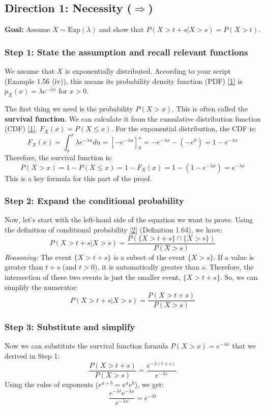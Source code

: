 \documentclass[11pt,a4paper]{article}
\begin{document}
\subsection{Direction 1: Necessity ($\Rightarrow$)}

\noindent \textbf{Goal:} Assume $X \sim \text{Exp}(\lambda)$ and show that $P(X > t + s | X > s) = P(X > t)$.

\subsubsection*{Step 1: State the assumption and recall relevant functions}
We assume that $X$ is exponentially distributed. According to your script (Example 1.56 (iv)), this means its probability density function (PDF) \hyperlink{note:pdfcdf}{[1]} is $p_X(x) = \lambda e^{-\lambda x}$ for $x > 0$.

The first thing we need is the probability $P(X > x)$. This is often called the \textbf{survival function}. We can calculate it from the cumulative distribution function (CDF) \hyperlink{note:pdfcdf}{[1]}, $F_X(x) = P(X \le x)$.
For the exponential distribution, the CDF is:
\[ F_X(x) = \int_0^x \lambda e^{-\lambda u} du = [ -e^{-\lambda u} ]_0^x = -e^{-\lambda x} - (-e^0) = 1 - e^{-\lambda x} \]
Therefore, the survival function is:
\[ P(X > x) = 1 - P(X \le x) = 1 - F_X(x) = 1 - (1 - e^{-\lambda x}) = e^{-\lambda x} \]
This is a key formula for this part of the proof.

\subsubsection*{Step 2: Expand the conditional probability}
Now, let's start with the left-hand side of the equation we want to prove. Using the definition of conditional probability \hyperlink{note:condprob}{[2]} (Definition 1.64), we have:
\[ P(X > t + s | X > s) = \frac{P(\{X > t+s\} \cap \{X > s\})}{P(X > s)} \]
\textit{Reasoning:} The event $\{X > t+s\}$ is a subset of the event $\{X > s\}$. If a value is greater than $t+s$ (and $t>0$), it is automatically greater than $s$. Therefore, the intersection of these two events is just the smaller event, $\{X > t+s\}$. So, we can simplify the numerator:
\[ P(X > t + s | X > s) = \frac{P(X > t+s)}{P(X > s)} \]

\subsubsection*{Step 3: Substitute and simplify}
Now we can substitute the survival function formula $P(X > x) = e^{-\lambda x}$ that we derived in Step 1:
\[ \frac{P(X > t+s)}{P(X > s)} = \frac{e^{-\lambda(t+s)}}{e^{-\lambda s}} \]
Using the rules of exponents ($e^{a+b} = e^a e^b$), we get:
\[ \frac{e^{-\lambda t} e^{-\lambda s}}{e^{-\lambda s}} = e^{-\lambda t} \]
\end{document}
